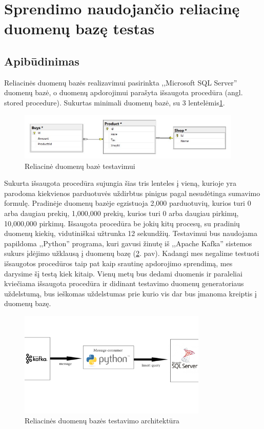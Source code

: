 \documentclass{VUMIFPSkursinis}
\begin{document}
\section{Sprendimo naudojančio reliacinę duomenų bazę testas}

\subsection{Apibūdinimas}

Reliacinės duomenų bazės realizavimui pasirinkta ,,Microsoft SQL Server'' duomenų bazė, o duomenų apdorojimui parašyta išsaugota procedūra (angl. stored procedure).
Sukurtas minimali duomenų bazė, su 3 lentelėmis\ref{fig:dbdiagram}.
\begin{figure}[!htbp]
    \centering
    \includegraphics[width=0.95\textwidth]{img/dbdiagram.jpg}
    \caption{Reliacinė duomenų bazė testavimui}
    \label{fig:dbdiagram}
\end{figure}

Sukurta išsaugota procedūra sujungia šias tris lenteles į vieną, kurioje yra parodoma kiekvienos parduotuvės uždirbtus pinigus pagal nesudėtinga sumavimo formulę.
Pradinėje duomenų bazėje egzistuoja 2,000 parduotuvių, kurios turi 0 arba daugiau prekių, 1,000,000 prekių, kurios turi 0 arba daugiau pirkimų, 10,000,000 pirkimų.
Išsaugota procedūra be jokių kitų procesų, su pradinių duomenų kiekių, vidutiniškai užtrunka 12 sekundžių. Testavimui bus naudojama papildoma ,,Python'' programa,
kuri gavusi žinutę iš ,,Apache Kafka'' sistemos sukurs įdėjimo užklausą į duomenų bazę (\ref{fig:generator}. pav). Kadangi mes negalime testuoti išsaugotos procedūros taip 
pat kaip srautinę apdorojimo sprendimą, mes darysime šį testą kiek kitaip. Vienų metų bus dedami duomenis ir paraleliai kviečiama išsaugota procedūra ir didinant 
testavimo duomenų generatoriaus uždelstumą, bus ieškomas uždelstumas prie kurio vis dar bus įmanoma kreiptis į duomenų bazę.

\begin{figure}[!htbp]
    \centering
    \includegraphics[width=0.8\textwidth]{img/dbms.jpg}
    \caption{Reliacinės duomenų bazės testavimo architektūra}
    \label{fig:generator}
\end{figure}
\end{document}
